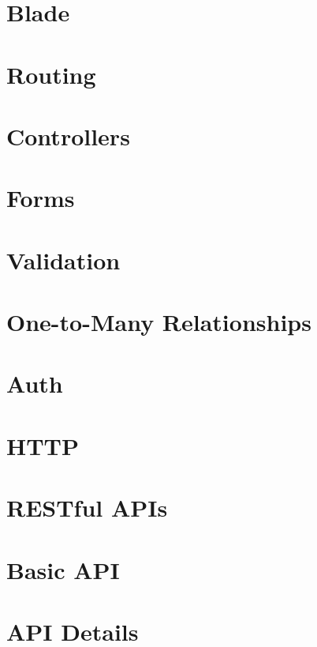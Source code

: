 \documentclass[b5paper,openany]{book}
\begin{document}
\chapter{Blade}


\chapter{Routing}


\chapter{Controllers}


\chapter{Forms}


\chapter{Validation}


\chapter{One-to-Many Relationships}


\chapter{Auth}


\chapter{HTTP}


\chapter{RESTful APIs}


\chapter{Basic API}


\chapter{API Details}

\end{document}
